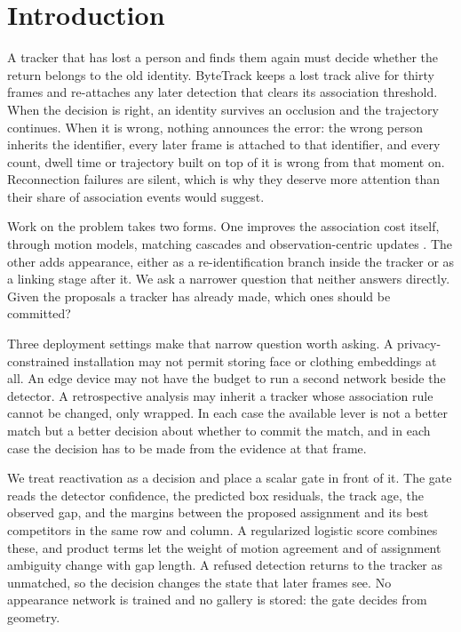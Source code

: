 \section{Introduction}

A tracker that has lost a person and finds them again must decide whether
the return belongs to the old identity. ByteTrack
\cite{zhang2022bytetrack} keeps a lost track alive for thirty frames and
re-attaches any later detection that clears its association threshold.
When the decision is right, an identity survives an occlusion and the
trajectory continues. When it is wrong, nothing announces the error: the
wrong person inherits the identifier, every later frame is attached to
that identifier, and every count, dwell time or trajectory built on top of
it is wrong from that moment on. Reconnection failures are silent, which
is why they deserve more attention than their share of association events
would suggest.

Work on the problem takes two forms. One improves the association cost
itself, through motion models, matching cascades and observation-centric
updates \cite{zhang2022bytetrack,aharon2022botsort,cao2023ocsort}. The
other adds appearance, either as a re-identification branch inside the
tracker or as a linking stage after it. We ask a narrower question that
neither answers directly. Given the proposals a tracker has already made,
which ones should be committed?

Three deployment settings make that narrow question worth asking. A
privacy-constrained installation may not permit storing face or clothing
embeddings at all. An edge device may not have the budget to run a second
network beside the detector. A retrospective analysis may inherit a tracker
whose association rule cannot be changed, only wrapped. In each case the
available lever is not a better match but a better decision about whether to
commit the match, and in each case the decision has to be made from the
evidence at that frame.

We treat reactivation as a decision and place a scalar gate in front of
it. The gate reads the detector confidence, the predicted box residuals,
the track age, the observed gap, and the margins between the proposed
assignment and its best competitors in the same row and column. A
regularized logistic score combines these, and product terms let the
weight of motion agreement and of assignment ambiguity change with gap
length. A refused detection returns to the tracker as unmatched, so the
decision changes the state that later frames see. No appearance network is
trained and no gallery is stored: the gate decides from geometry.

